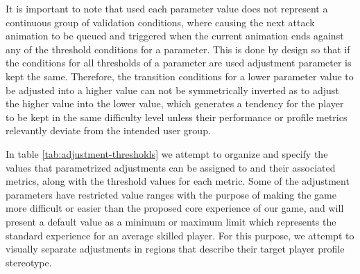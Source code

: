 It is important to note that used each parameter value does not represent a continuous group of validation conditions, where causing the next attack animation to be queued and triggered when the current animation ends against any of the threshold conditions for a parameter. This is done by design so that if the conditions for all thresholds of a parameter are used adjustment parameter is kept the same. Therefore, the transition conditions for a lower parameter value to be adjusted into a higher value can not be symmetrically inverted as to adjust the higher value into the lower value, which generates a tendency for the player to be kept in the same difficulty level unless their performance or profile metrics relevantly deviate from the intended user group.

In table \ref{tab:adjustment-thresholds} we attempt to organize  and specify the values that parametrized adjustments can be assigned to and their associated metrics, along with the threshold values for each metric. Some of the adjustment parameters have restricted value ranges with the purpose of making the game more difficult or easier than the proposed core experience of our game, and will present a default value as a minimum or maximum limit which represents the standard experience for an average skilled player. For this purpose, we attempt to visually separate adjustments in regions that describe their target player profile stereotype.



